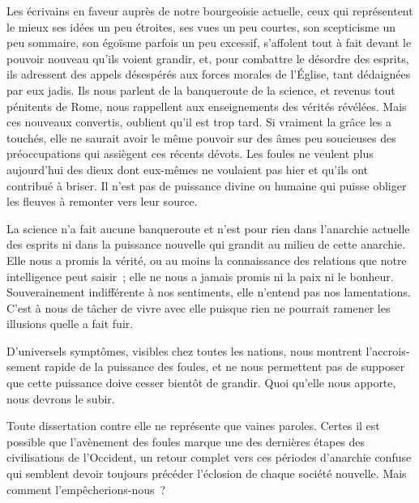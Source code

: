 \documentclass[french,twoside]{book} %
\begin{document}
Les écrivains en faveur auprès de notre bourgeoisie actuelle, ceux qui représentent le mieux ses idées un peu étroites, ses vues un peu courtes, son scepticisme un peu sommaire, son égoïsme parfois un peu excessif, s’affolent tout à fait devant le pouvoir nouveau qu’ils voient grandir, et, pour combattre le désordre des esprits, ils adressent des appels désespérés aux forces morales de l’Église, tant dédaignées par eux jadis. Ils nous parlent de la banqueroute de la science, et revenus tout pénitents de Rome, nous rappellent aux enseignements des vérités révélées. Mais ces nouveaux convertis, oublient qu’il est trop tard. Si vraiment la grâce les a touchés, elle ne saurait avoir le même pouvoir sur des âmes peu soucieuses des préoccupations qui assiègent ces récents dévots. Les foules ne veulent plus aujourd’hui des dieux dont eux-mêmes ne voulaient pas hier et qu’ils ont contribué à briser. Il n’est pas de puissance divine ou humaine qui puisse obliger les fleuves à remonter vers leur source.\par
La science n’a fait aucune banqueroute et n’est pour rien dans l’anarchie actuelle des esprits ni dans la puissance nouvelle qui grandit au milieu de cette anarchie. Elle nous a promis la vérité, ou au moins la connaissance des relations que notre intelli­gence peut saisir ; elle ne nous a jamais promis ni la paix ni le bonheur. Souveraine­ment indifférente à nos sentiments, elle n’entend pas nos lamentations. C’est à nous de tâcher de vivre avec elle puisque rien ne pourrait ramener les illusions quelle a fait fuir.\par
D’universels symptômes, visibles chez toutes les nations, nous montrent l’accrois­sement rapide de la puissance des foules, et ne nous permettent pas de supposer que cette puissance doive cesser bientôt de grandir. Quoi qu’elle nous apporte, nous de­vrons le subir.\par
Toute dissertation contre elle ne représente que vaines paroles. Certes il est possible que l’avènement des foules marque une des dernières étapes des civilisations de l’Occident, un retour complet vers ces périodes d’anarchie confuse qui semblent devoir toujours précéder l’éclosion de chaque société nouvelle. Mais comment l’em­pêcherions-nous ?\par
\end{document}
